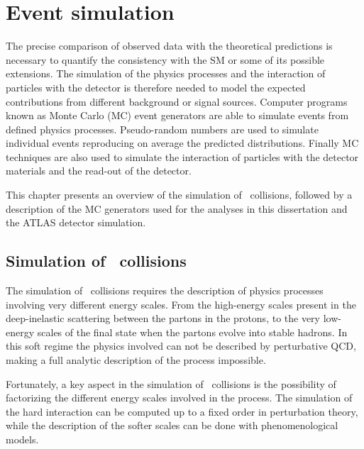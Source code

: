 \chapter{Event simulation}
\label{chapter:MCsimulation}

The precise comparison of observed data with the theoretical predictions is necessary to quantify the consistency with the SM or some of its possible extensions. The simulation of the physics processes and the interaction of particles with the detector is therefore needed to model the expected contributions from different background or signal sources. Computer programs known as Monte Carlo (MC) event generators are able to simulate events from defined physics processes. Pseudo-random numbers are used to simulate individual events reproducing on average the predicted distributions. Finally MC techniques are also used to simulate the interaction of particles with the detector materials and the read-out of the detector.

This chapter presents an overview of the simulation of \pp\ collisions, followed by a description of the MC generators used for the analyses in this dissertation and the ATLAS detector simulation.

\section{Simulation of \pp\ collisions}
\label{sec:pp_simulation}
The simulation of \pp\ collisions requires the description of physics processes involving very different energy scales. From the high-energy scales present in the deep-inelastic scattering between the partons in the protons, to the very low-energy scales of the final state when the partons evolve into stable hadrons. In this soft regime the physics involved can not be described by perturbative QCD, making a full analytic description of the process impossible.

Fortunately, a key aspect in the simulation of \pp\ collisions is the possibility of factorizing the different energy scales involved in the process. The simulation of the hard interaction can be computed up to a fixed order in perturbation theory, while the description of the softer scales can be done with phenomenological models.

